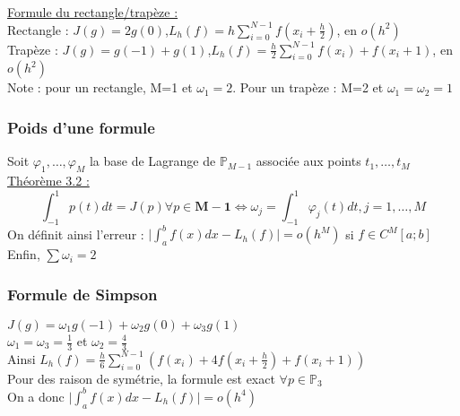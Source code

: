 \documentclass[../main.tex]{subfiles}
\begin{document}
\quad \underline{Formule du rectangle/trapèze :}\\

Rectangle : $J(g) = 2g(0)$,\quad $L_h(f) = h\sum_{i=0}^{N-1} f(x_i+\frac{h}{2})$, en $o(h^2)$\\

Trapèze : $J(g) = g(-1)+g(1)$,\quad $L_h(f) = \frac{h}{2} \sum_{i=0}^{N-1}f(x_i)+f(x_i+1)$, en $o(h^2)$\\

\color{gray} Note : pour un rectangle, M=1 et $\omega_1 = 2$. Pour un trapèze : M=2 et $\omega_1=\omega_2 = 1$\color{black}\\

\subsubsection{Poids d'une formule}
Soit $\varphi_1, \dots, \varphi_M$ la base de Lagrange de $\mathbb{P}_{M-1}$ associée aux points $t_1, \dots, t_M$\\

\quad \underline{Théorème 3.2 :}\\
\begin{equation}
    \int_{-1}^1p(t)dt = J(p) \forall p\in \mathbf{M-1} \Leftrightarrow \omega_j = \int_{-1}^1 \varphi_j(t)dt, j=1,\dots, M
\end{equation}
On définit ainsi l'erreur : $\lvert \int_a^b f(x)dx -L_h(f)\rvert = o(h^M)$ si $f\in C^M[a;b]$\\
Enfin, $\sum \omega_i = 2$\\

\subsubsection{Formule de Simpson}
$J(g) = \omega_1 g(-1) + \omega_2g(0) + \omega_3g(1)$\\
$\omega_1 = \omega_3 = \frac{1}{3}$ et $\omega_2 = \frac{4}{3}$\\
Ainsi $L_h(f) = \frac{h}{6} \sum_{i=0}^{N-1}(f(x_i)+4f(x_i+\frac{h}{2})+f(x_i+1))$\\
Pour des raison de symétrie, la formule est exact $\forall p \in \mathbb{P}_3$\\
On a donc $\lvert \int_a^b f(x)dx - L_h(f)\rvert = o(h^4)$\\
\end{document}
